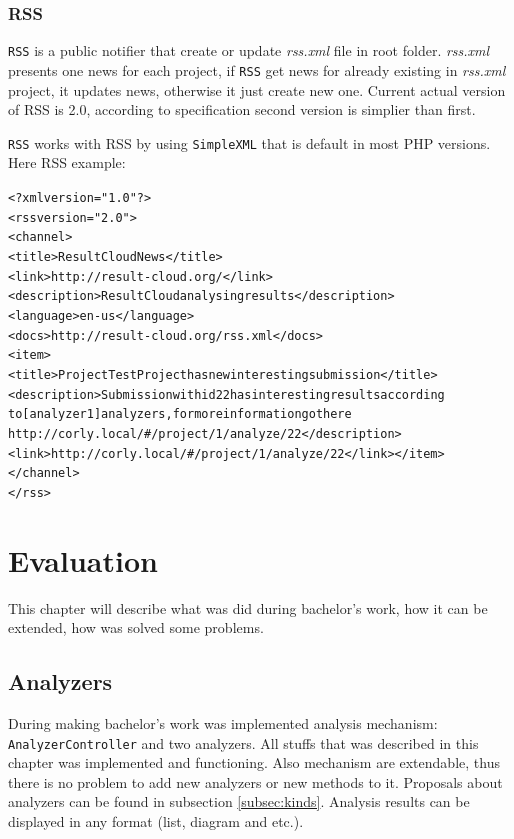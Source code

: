 \subsection{RSS}

\texttt{RSS} is a public notifier that create or update \emph{rss.xml} file in root folder. \emph{rss.xml} presents one news for each project, if \texttt{RSS} get news for already existing in \emph{rss.xml} project, it updates news, otherwise it just create new one. Current actual version of RSS is 2.0, according to specification \cite{rss} second version is simplier than first.

\texttt{RSS} works with RSS by using \texttt{SimpleXML} that is default in most PHP versions. Here RSS example:
\begin{alltt}
<?xml version="1.0"?>
<rss version="2.0"> 
<channel>
<title>ResultCloud News</title>
<link>http://result-cloud.org/</link>
<description>ResultCloud analysing results</description>
<language>en-us</language>
<docs>http://result-cloud.org/rss.xml</docs>
<item>
<title>Project TestProject has new interesting submission</title>
<description>Submission with id 22 has interesting results according\\ to [analyzer1] analyzers, for more information go there\\ http://corly.local/#/project/1/analyze/22</description>
<link>http://corly.local/#/project/1/analyze/22</link></item>
</channel>
</rss>

\end{alltt}

\chapter{Evaluation}

This chapter will describe what was did during bachelor's work, how it can be extended, how was solved some problems.

\section{Analyzers}

During making bachelor's work was implemented analysis mechanism: \texttt{AnalyzerController} and two analyzers. All stuffs that was described in this chapter was implemented and functioning. Also mechanism are extendable, thus there is no problem to add new analyzers or new methods to it. Proposals about analyzers can be found in subsection \ref{subsec:kinds}. Analysis results can be displayed in any format (list, diagram and etc.).

